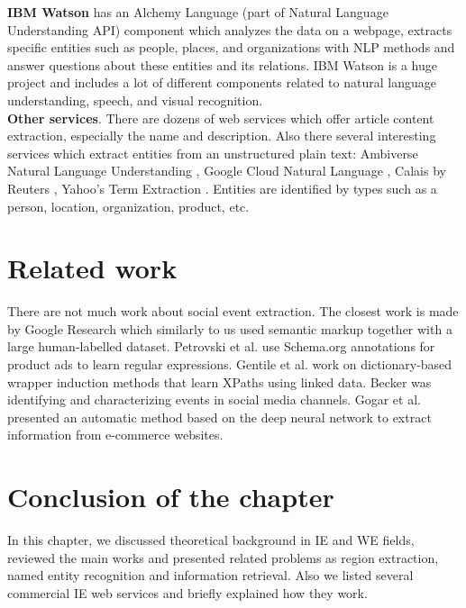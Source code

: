 \noindent \textbf{IBM Watson} \cite{IBMAlchemy} has an Alchemy Language (part of Natural Language Understanding API) component which analyzes the data on a webpage, extracts specific entities such as people, places, and organizations with NLP methods and answer questions about these entities and its relations. IBM Watson is a huge project and includes a lot of different components related to natural language understanding, speech, and visual recognition.\\  

\noindent\textbf{Other services}. There are dozens of web services which offer article content extraction, especially the name and description. Also there several interesting services which extract entities from an unstructured plain text: Ambiverse Natural Language Understanding \cite{Ambiverse}, Google Cloud Natural Language \cite{GoogNLP}, Calais by Reuters \cite{calais}, Yahoo’s Term Extraction \cite{yahoo}. Entities are identified by types such as a person, location, organization, product, etc.

\section{Related work}

There are not much work about social event extraction. The closest work is made by Google Research \cite{GoogEvent} which similarly to us used semantic markup together with a large human-labelled dataset. Petrovski et al. \cite{Petrovski} use Schema.org annotations for product ads to learn regular expressions. Gentile et al. \cite{Gentile} work on dictionary-based wrapper induction methods that learn XPaths using linked data. Becker \cite{becker} was identifying
and characterizing events in social media channels. Gogar et al. \cite{Gogar2016}
presented an automatic method based on the deep neural network to extract information from e-commerce websites.

\section*{Conclusion of the chapter}
In this chapter, we discussed theoretical background in IE and WE fields, reviewed the main works and presented related problems as region extraction, named entity recognition and information retrieval. Also we listed several commercial IE web services and briefly explained how they work.